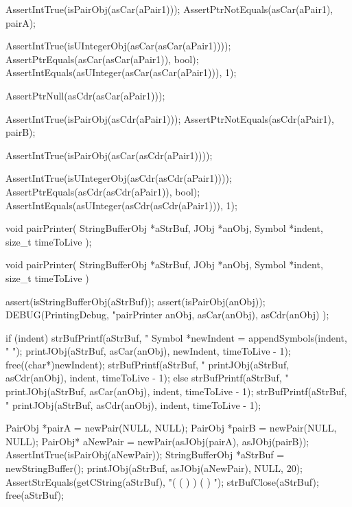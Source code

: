   AssertIntTrue(isPairObj(asCar(aPair1)));
  AssertPtrNotEquals(asCar(aPair1), pairA);

  AssertIntTrue(isUIntegerObj(asCar(asCar(aPair1))));
  AssertPtrEquals(asCar(asCar(aPair1)), bool);
  AssertIntEquals(asUInteger(asCar(asCar(aPair1))), 1);

  AssertPtrNull(asCdr(asCar(aPair1)));

  AssertIntTrue(isPairObj(asCdr(aPair1)));
  AssertPtrNotEquals(asCdr(aPair1), pairB);

  AssertIntTrue(isPairObj(asCar(asCdr(aPair1))));

  AssertIntTrue(isUIntegerObj(asCdr(asCdr(aPair1))));
  AssertPtrEquals(asCdr(asCdr(aPair1)), bool);
  AssertIntEquals(asUInteger(asCdr(asCdr(aPair1))), 1);
\stopCTest
\stopTestCase
\stopTestSuite

\startTestSuite[pairPrinter]

\startCHeader
void pairPrinter(
  StringBufferObj *aStrBuf,
  JObj            *anObj,
  Symbol          *indent,
  size_t          timeToLive
);
\stopCHeader

\startCCode
void pairPrinter(
  StringBufferObj *aStrBuf,
  JObj            *anObj,
  Symbol          *indent,
  size_t           timeToLive
) {
  assert(isStringBufferObj(aStrBuf));
  assert(isPairObj(anObj));
  DEBUG(PrintingDebug, "pairPrinter %
    anObj, asCar(anObj), asCdr(anObj) );
  
  if (indent) {
    strBufPrintf(aStrBuf, "%
    Symbol *newIndent = appendSymbols(indent, "  ");
    printJObj(aStrBuf, asCar(anObj), newIndent, timeToLive - 1);
    free((char*)newIndent);
    strBufPrintf(aStrBuf, "%
    printJObj(aStrBuf, asCdr(anObj), indent, timeToLive - 1);
  } else {
    strBufPrintf(aStrBuf, "%
    printJObj(aStrBuf, asCar(anObj), indent, timeToLive - 1);
    strBufPrintf(aStrBuf, "%
    printJObj(aStrBuf, asCdr(anObj), indent, timeToLive - 1);
  }
  
}
\stopCCode


\startCTest
  PairObj *pairA = newPair(NULL, NULL);
  PairObj *pairB = newPair(NULL, NULL);
  PairObj* aNewPair = newPair(asJObj(pairA), asJObj(pairB));
  AssertIntTrue(isPairObj(aNewPair));
  StringBufferObj *aStrBuf = newStringBuffer();
  printJObj(aStrBuf, asJObj(aNewPair), NULL, 20);
  AssertStrEquals(getCString(aStrBuf), "( (  )  ) (  )  ");
  strBufClose(aStrBuf);
  free(aStrBuf);
\stopCTest
\stopTestCase
\stopTestSuite

